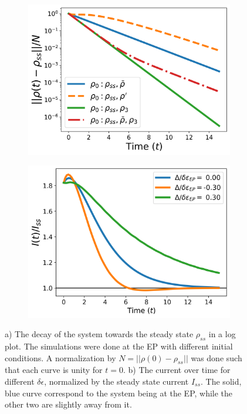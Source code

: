 \documentclass[../main.tex]{subfiles}
\begin{document}
\begin{figure}[H]
\centering
\begin{subfigure}[t]{.5\textwidth}
  \centering
  \includegraphics[width=\linewidth]{figures/rho_diff_rho0.png}
  \caption{}
  \label{fig:diffrho0}
\end{subfigure}%
\begin{subfigure}[t]{.5\textwidth}
  \centering
  \includegraphics[width=\linewidth]{figures/curr_diff_de.png}
  \caption{}
  \label{fig:diffde}
\end{subfigure}
\caption{a) The decay of the system towards the steady state $\rho_{ss}$ in a log plot. The simulations were done at the EP with different initial conditions. A normalization by $N=||\rho(0) - \rho_{ss}||$ was done such that each curve is unity for $t=0$. b) The current over time for different $\delta\epsilon$, normalized by the steady state current $I_{ss}$. The solid, blue curve correspond to the system being at the EP, while the other two are slightly away from it.}
\label{fig:diff}
\end{figure}
\end{document}
